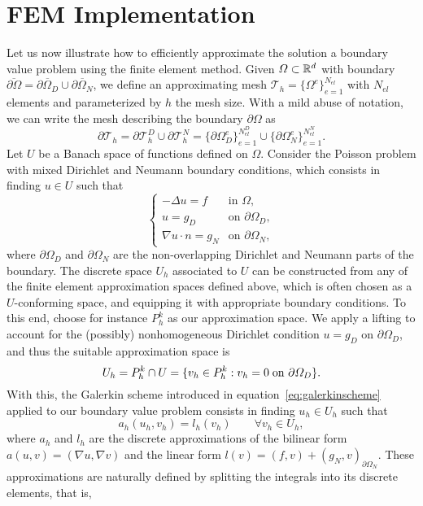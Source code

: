 \section{FEM Implementation}
Let us now illustrate how to efficiently approximate the solution a boundary value problem using the finite element method. Given $\Omega\subset \mathbb{R}^d$ with boundary $\overline{\partial \Omega} = \overline{\partial\Omega_D} \cup \overline{\partial\Omega_N}$, we define an approximating mesh  $\mathcal{T}_h = \{\Omega^e\}_{e=1}^{N_{el}}$ with $N_{el}$ elements and parameterized by $h$ the mesh size. With a mild abuse of notation,  we can write the mesh describing the boundary $\partial\Omega$ as 
\begin{equation*}
\partial\mathcal{T}_h = \partial\mathcal{T}_h^D \cup\partial\mathcal{T}_h^N = \{\partial\Omega^e_D\}_{e=1}^{N_{el}^D} \cup \{\partial\Omega^e_N\}_{e=1}^{N_{el}^N}.
\end{equation*}
Let $U$ be a Banach space of functions defined on $\Omega$. Consider the Poisson problem with mixed Dirichlet and Neumann boundary conditions, which consists in finding $u\in U$ such that
\begin{equation*}
\begin{cases}
    -\Delta u = f & \text{in } \Omega, \\
    u = g_D & \text{on } \partial\Omega_D, \\
    \nabla u \cdot n = g_N & \text{on } \partial\Omega_N,
\end{cases}
\end{equation*}
where $\partial\Omega_D$ and $\partial\Omega_N$ are the non-overlapping Dirichlet and Neumann parts of the boundary. The discrete space $U_h$ associated to $U$ can be constructed from any of the finite element approximation spaces defined above, which is often chosen as a $U$-conforming space, and equipping it with appropriate boundary conditions. To this end, choose for instance $P_h^k$ as our approximation space. We apply a lifting to account for the (possibly) nonhomogeneous Dirichlet condition $u=g_D$ on $\partial\Omega_D$, and thus the suitable approximation space is
\begin{equation*}
U_h = P_h^k \cap U = \{v_h\in P_h^k: v_h = 0 \;\text{on } \partial\Omega_D\}.
\end{equation*}
With this, the Galerkin scheme introduced in equation~\ref{eq:galerkinscheme} applied to our boundary value problem consists in finding $u_h \in U_h$ such that 
\begin{equation*}
a_h(u_h, v_h) = l_h(v_h) \qquad \forall v_h \in U_h,
\end{equation*}
where $a_h$ and $l_h$ are the discrete approximations of the bilinear form $a(u,v)=(\nabla u, \nabla v)$ and the linear form $l(v) = (f,v) + (g_N, v)_{\partial\Omega_N}$. These approximations are naturally defined by splitting the integrals into its discrete elements, that is, 

